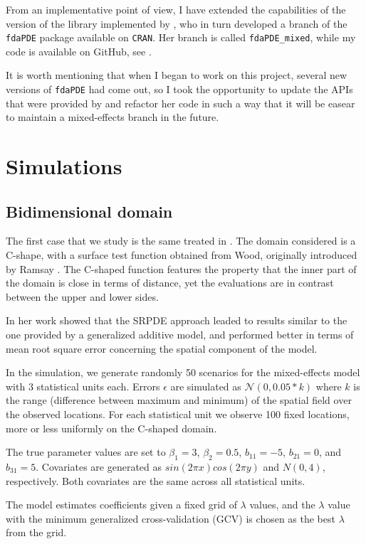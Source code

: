 From an implementative point of view, I have extended the capabilities of the
version of the library implemented by \citeauthor{kim}, who in turn developed a
branch of the \texttt{fdaPDE} package available on \texttt{CRAN}. Her branch is
called \texttt{fdaPDE\_mixed}, while my code is available on GitHub, see
\cite{MI}.

It is worth mentioning that when I began to work on this project, several new
versions of \texttt{fdaPDE} had come out, so I took the opportunity to update
the APIs that were provided by \citeauthor{kim} and refactor her code in such a
way that it will be easear to maintain a mixed-effects branch in the future.

\section{Simulations}
\subsection{Bidimensional domain}
The first case that we study is the same treated in \cite{kim}. The domain
considered is a C-shape, with a surface test function obtained from
Wood\cite{wood2008soap}, originally introduced by Ramsay
\cite{ramsay2002spline}. The C-shaped function features the property that the
inner part of the domain is close in terms of distance, yet the evaluations are
in contrast between the upper and lower sides.

In her work \citeauthor{kim} showed that the SRPDE approach leaded to results
similar to the one provided by a generalized additive model, and performed
better in terms of mean root square error concerning the spatial component of
the model.

In the simulation, we generate randomly 50 scenarios for the mixed-effects
model with 3 statistical units each. Errors $\epsilon$ are simulated as
$\mathcal{N}(0, 0.05*k)$ where $k$ is the range (difference between maximum and
minimum) of the spatial field over the observed locations. For each statistical
unit we observe 100 fixed locations, more or less uniformly on the C-shaped
domain.

The true parameter values are set to $\beta_1 = 3$, $\beta_2 = 0.5$, $b_{11} =
	-5$, $b_{21} = 0$, and $b_{31} = 5$. Covariates are generated as $sin(2\pi
	x)cos(2\pi y)$ and $N(0, 4)$, respectively. Both covariates are the same across
all statistical units.

The model estimates coefficients given a fixed grid of $\lambda$ values, and
the $\lambda$ value with the minimum generalized cross-validation (GCV) is
chosen as the best $\lambda$ from the grid.

